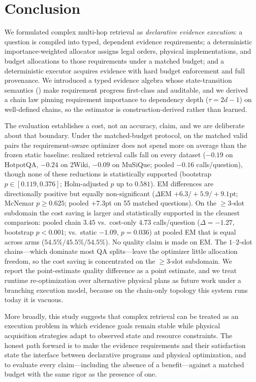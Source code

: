 \section{Conclusion}
\label{sec:conclusion}

We formulated complex multi-hop retrieval as \emph{declarative evidence
execution}: a question is compiled into typed, dependent evidence requirements;
a deterministic importance-weighted allocator assigns legal orders, physical
implementations, and budget allocations to those requirements under a matched
budget; and a deterministic executor acquires evidence with hard budget
enforcement and full provenance. We introduced a typed evidence algebra whose
state-transition semantics () make requirement
progress first-class and auditable, and we derived a chain law pinning
requirement importance to dependency depth ($\tau = 2d-1$) on well-defined
chains, so the estimator is construction-derived rather than learned.

The evaluation establishes a cost, not an accuracy, claim, and we are
deliberate about that boundary. Under the matched-budget protocol, on the
matched valid pairs the requirement-aware optimizer does not spend more on
average than the frozen static baseline:
realized retrieval calls fall on every dataset ($-0.19$ on HotpotQA, $-0.24$
on 2Wiki, $-0.09$ on MuSiQue; pooled $-0.16$ calls/question), though none of
these reductions is statistically supported (bootstrap $p \in [0.119,0.376]$;
Holm-adjusted $p$ up to $0.581$). EM differences are directionally positive
but equally non-significant ($\Delta$EM $+6.3/+5.9/+9.1$pt; McNemar
$p\geq 0.625$; pooled $+7.3$pt on 55 matched questions). On the $\ge 3$-slot
subdomain the cost saving is larger and statistically supported in the cleanest
comparison: pooled chain $3.45$ vs.\ cost-only $4.73$ calls/question
($\Delta=-1.27$, bootstrap $p<0.001$; vs.\ static $-1.09$, $p=0.036$) at pooled
EM that is equal across arms ($54.5\%/45.5\%/54.5\%$). No quality claim is made on
EM. The $1$--$2$-slot chains---which dominate most QA splits---leave the
optimizer little allocation freedom, so the cost saving is concentrated on the
$\ge 3$-slot subdomain.
We report the point-estimate quality difference as a point estimate, and we treat
runtime re-optimization over alternative physical plans as future work under a
branching execution model, because on the chain-only topology this system runs
today it is vacuous.

More broadly, this study suggests that complex retrieval can be treated as an
execution problem in which evidence goals remain stable while physical
acquisition strategies adapt to observed state and resource constraints. The
honest path forward is to make the evidence requirements and their satisfaction
state the interface between declarative programs and physical optimization, and
to evaluate every claim---including the absence of a benefit---against a
matched budget with the same rigor as the presence of one.

